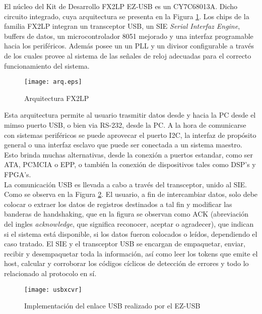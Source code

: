 	El núcleo del Kit de Desarrollo FX2LP EZ-USB es un CY7C68013A. Dicho circuito integrado, cuya arquitectura se presenta en la Figura \ref{arqEzUSB}. Los chips de la familia FX2LP integran un transceptor USB, un SIE {\it Serial Interfaz Engine}, buffers de datos, un microcontrolador 8051 mejorado y una interfaz programable hacia los periféricos. Además posee un un PLL y un divisor configurable a través de los cuales provee al sistema de las señales de reloj adecuadas para el correcto funcionamiento del sistema.\\
	
	\begin{figure}[h]
		\centering
		\texttt{[image: arq.eps]}
		\caption{Arquitectura FX2LP} 
		\label{arqEzUSB}
	\end{figure}

	Esta arquitectura permite al usuario trasmitir datos desde y hacia la PC desde el mimso puerto USB, o bien via RS-232, desde la PC. A la hora de comunicarse con sistemas periféricos se puede aprovecar el puerto I2C, la interfaz de propósito general o una interfaz esclavo que puede ser conectada a un sistema maestro. Esto brinda muchas alternativas, desde la conexión a puertos estandar, como ser ATA, PCMCIA o EPP, o también la conexión de dispositivos tales como DSP's y FPGA's.\\
	
	La comunicación USB es llevada a cabo a través del transceptor, unido al SIE. Como se observa en la Figura \ref{usbxcvr}. El usuario, a fin de intercambiar datos, solo debe colocar o extraer los datos de registros destinados a tal fin y modificar las banderas de handshaking, que en la figura se observan como ACK (abreviación del ingles {\it acknowledge}, que significa reconocer, aceptar o agradecer), que indican si el sistema está disponible, si los datos fueron colocados o leídos, dependiendo el caso tratado. El SIE y el transceptor USB se encargan de empaquetar, enviar, recibir y desempaquetar toda la información, así como leer los tokens que emite el host, calcular y corroborar los códigos cíclicos de detección de errores y todo lo relacionado al protocolo en sí.\\
	
	\begin{figure}[h]
		\centering
		\texttt{[image: usbxcvr]}
		\caption{Implementación del enlace USB realizado por el EZ-USB}
		\label{usbxcvr}
	\end{figure}
	
